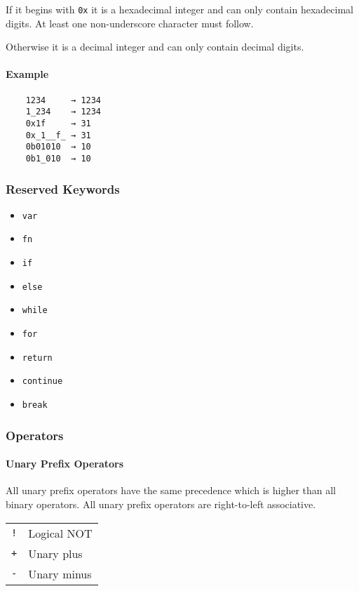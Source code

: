 If it begins with \verb|0x| it is a hexadecimal integer and can only contain hexadecimal digits. At least one non-underscore character must follow.

Otherwise it is a decimal integer and can only contain decimal digits.

\paragraph{Example}

\begin{verbatim}
    1234     → 1234
    1_234    → 1234
    0x1f     → 31
    0x_1__f_ → 31
    0b01010  → 10
    0b1_010  → 10
\end{verbatim}

\subsubsection{Reserved Keywords}

\begin{itemize}
    \item \verb|var|
    \item \verb|fn|
    \item \verb|if|
    \item \verb|else|
    \item \verb|while|
    \item \verb|for|
    \item \verb|return|
    \item \verb|continue|
    \item \verb|break|
\end{itemize}

\subsubsection{Operators}

\paragraph{Unary Prefix Operators}

All unary prefix operators have the same precedence which is higher than all binary operators. All unary prefix operators are right-to-left associative.

\begin{table}[H]
    \begin{tabular}{ l l }
        \verb|!| & Logical NOT \\
        \verb|+| & Unary plus  \\
        \verb|-| & Unary minus
    \end{tabular}
\end{table}

